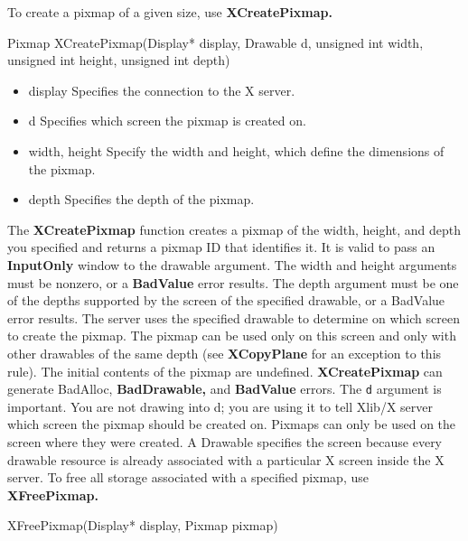 \documentclass{report}
\begin{document}
\begin{itemize}
            \bigbreak \noindent 
            To create a pixmap of a given size, use \textbf{XCreatePixmap.}
            \begin{cppcode}
                Pixmap XCreatePixmap(Display* display, Drawable d, unsigned int width, unsigned int height, unsigned int depth)
            \end{cppcode}
            \begin{itemize}
                \item display Specifies the connection to the X server.
                \item d Specifies which screen the pixmap is created on.
                \item width, height Specify the width and height, which define the dimensions of the pixmap.
                \item depth Specifies the depth of the pixmap.
            \end{itemize}
            The \textbf{XCreatePixmap} function creates a pixmap of the width, height, and depth you specified and returns a pixmap ID that identifies it. It is valid to pass an \textbf{InputOnly} window to the drawable argument. The width and height arguments must be nonzero, or a \textbf{BadValue} error results. The depth argument must be one of the depths supported by the screen of the specified drawable, or a BadValue error results.
            \bigbreak \noindent 
            The server uses the specified drawable to determine on which screen to create the pixmap. The pixmap can be used only on this screen and only with other drawables of the same depth (see \textbf{XCopyPlane} for an exception to this rule). The initial contents of the pixmap are undefined. \textbf{XCreatePixmap} can generate BadAlloc, \textbf{BadDrawable,} and \textbf{BadValue} errors.
            \bigbreak \noindent 
            The \texttt{d} argument is important. You are not drawing into d; you are using it to tell Xlib/X server which screen the pixmap should be created on. Pixmaps can only be used on the screen where they were created.
            \bigbreak \noindent 
            A Drawable specifies the screen because every drawable resource is already associated with a particular X screen inside the X server.
            \bigbreak \noindent 
            To free all storage associated with a specified pixmap, use \textbf{XFreePixmap.}
            \bigbreak \noindent 
            \begin{cppcode}
                XFreePixmap(Display* display, Pixmap pixmap)
            \end{cppcode}

\end{itemize}
\end{document}
